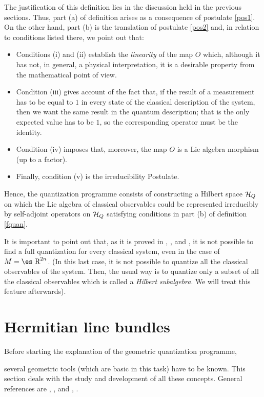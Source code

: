 \documentclass[12pt]{article}
\def\H{{\cal H}}
\def\Real{\mbox{\es R}}
\begin{document}
The justification of this definition lies in the discussion held in the
previous sections.
Thus, part (a) of definition arises as a consequence of postulate
\ref{pos1}.
On the other hand, part (b) is the translation of postulate
\ref{pos2} and, in relation to conditions listed there, we point out
that:
\begin{itemize}
\item
Conditions (i) and (ii) establish the {\it linearity} of the map $O$
which,
although it has not, in general, a physical interpretation,
it is a desirable property from the mathematical point of view.
\item
Condition (iii) gives account of the fact that,
if the result of a measurement has to be equal to $1$
in every state of the classical description of the system,
then we want the same result in the quantum description;
that is the only expected value has to be $1$, so the corresponding
operator must be the identity.
\item
Condition (iv) imposes that, moreover,
the map $O$ is a Lie algebra morphism (up to a factor).
\item
Finally, condition (v) is the irreducibility Postulate.
\end{itemize}

Hence, the quantization programme consists of constructing a Hilbert
space $\H_Q$
on which the Lie algebra of classical observables could be represented
irreducibly by self-adjoint operators on $\H_Q$
satisfying conditions in part (b) of definition \ref{fquan}.

It is important to point out that, as it is proved in
\cite{AM-78}, \cite{Go-80}, \cite{Gr-46} and \cite{Vh-51},
it is not possible to find a full quantization for every classical
system,
even in the case of $M=\Real^{2n}$. (In this last case, it is not
possible to quantize
all the classical observables of the system.
Then, the usual way is to quantize only a subset of all the classical
observables
which is called a {\it Hilbert subalgebra}. We will treat this feature
afterwards).



\section{Hermitian line bundles}


Before starting the explanation of the geometric quantization programme,

several geometric tools (which are basic in this task)
have to be known. This section deals with
the study and development of all these concepts.
General references are  \cite{Bl-gq}, \cite{Ga-83}, \cite{Ko-70} and
\cite{Wo-80}, .
\end{document}
